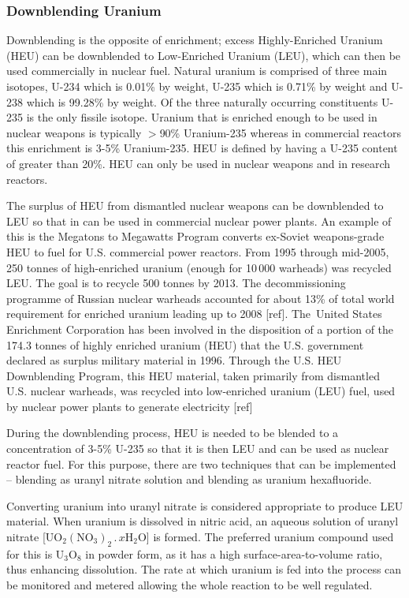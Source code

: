 \documentclass[twocolumn,a4paper]{article}
\begin{document}
\subsubsection{Downblending Uranium}
Downblending is the opposite of enrichment; excess Highly-Enriched
Uranium (HEU) can be downblended to Low-Enriched Uranium (LEU), which
can then be used commercially in nuclear fuel. Natural uranium is
comprised of three main isotopes, U-234 which is 0.01\% by weight,
U-235 which is 0.71\% by weight and U-238 which is 99.28\% by weight.
Of the three naturally occurring constituents U-235 is the only
fissile isotope.  Uranium that is enriched enough to be used in
nuclear weapons is typically \(>\)90\% Uranium-235 whereas in
commercial reactors this enrichment is 3-5\% Uranium-235.  HEU is
defined by having a U-235 content of greater than 20\%. HEU can only
be used in nuclear weapons and in research reactors.

The surplus of HEU from dismantled nuclear weapons can be downblended
to LEU so that in can be used in commercial nuclear power plants. An
example of this is the Megatons to Megawatts Program converts
ex-Soviet weapons-grade HEU to fuel for U.S. commercial power
reactors. From 1995 through mid-2005, 250 tonnes of high-enriched
uranium (enough for 10\,000 warheads) was recycled LEU. The goal is to
recycle 500 tonnes by 2013. The decommissioning programme of Russian
nuclear warheads accounted for about 13\% of total world requirement
for enriched uranium leading up to 2008 [ref]. The United States
Enrichment Corporation has been involved in the disposition of a
portion of the 174.3 tonnes of highly enriched uranium (HEU) that the
U.S. government declared as surplus military material in 1996. Through
the U.S. HEU Downblending Program, this HEU material, taken primarily
from dismantled U.S. nuclear warheads, was recycled into low-enriched
uranium (LEU) fuel, used by nuclear power plants to generate
electricity [ref]

During the downblending process, HEU is needed to be blended to a
concentration of 3-5\% U-235 so that it is then LEU and can be used as
nuclear reactor fuel. For this purpose, there are two techniques that
can be implemented -- blending as uranyl nitrate solution and blending
as uranium hexafluoride.

Converting uranium into uranyl nitrate is considered appropriate to
produce LEU material.  When uranium is dissolved in nitric acid, an
aqueous solution of uranyl nitrate
[\(\mathrm{UO_2(NO_3)_2\,.\,}x\mathrm{H_2O}\)] is formed. The
preferred uranium compound used for this is \(\mathrm{U_3O_8}\) in
powder form, as it has a high surface-area-to-volume ratio, thus
enhancing dissolution. The rate at which uranium is fed into the
process can be monitored and metered allowing the whole reaction to be
well regulated.
\end{document}
